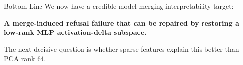 \documentclass[aspectratio=169]{beamer}
\begin{document}
\begin{frame}{Bottom Line}
  \Large
  We now have a credible model-merging interpretability target:

  \vspace{0.4cm}
  \normalsize
  \begin{center}
    \textbf{A merge-induced refusal failure that can be repaired by restoring a low-rank MLP activation-delta subspace.}
  \end{center}

  \vspace{0.4cm}
  The next decisive question is whether sparse features explain this better than PCA rank 64.
\end{frame}
\end{document}
